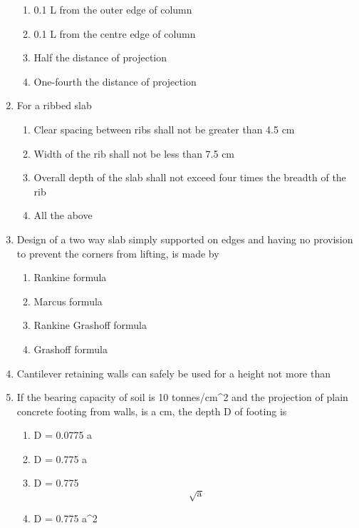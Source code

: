 \documentclass[11pt,a4paper]{article}
\begin{document}
\begin{enumerate}
\begin{enumerate}[label=\Alph*.]
\item{0.1 L from the outer edge of column}
\item{0.1 L from the centre edge of column}
\item{Half the distance of projection}
\item{One-fourth the distance of projection}
\end{enumerate}
\item{For a ribbed slab}
\begin{enumerate}[label=\Alph*.]
\item{Clear spacing between ribs shall not be greater than 4.5 cm}
\item{Width of the rib shall not be less than 7.5 cm}
\item{Overall depth of the slab shall not exceed four times the breadth of the rib}
\item{All the above}
\end{enumerate}
\item{Design of a two way slab simply supported on edges and having no provision to prevent the corners from lifting, is made by}
\begin{enumerate}[label=\Alph*.]
\item{Rankine formula}
\item{Marcus formula}
\item{Rankine Grashoff formula}
\item{Grashoff formula}
\end{enumerate}
\item{Cantilever retaining walls can safely be used for a height not more than}
\\
\item{If the bearing capacity of soil is 10 tonnes/cm\^{}2 and the projection of plain concrete footing from walls, is a cm, the depth D of footing is
}
\begin{enumerate}[label=\Alph*.]
\item{D = 0.0775 a}
\item{D = 0.775 a}
\item{D = 0.775 $$\sqrt {\text{a}} $$}
\item{D = 0.775 a\^{}2}

\end{enumerate}
\end{enumerate}
\end{document}
